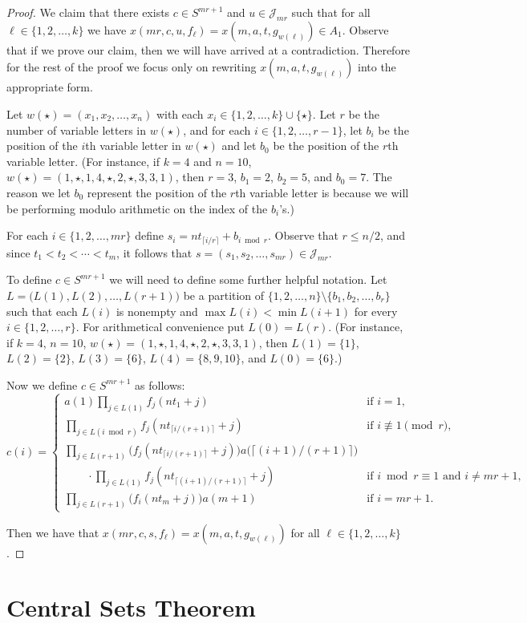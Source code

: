 \documentclass[12pt]{article}
\theoremstyle{plain}
\theoremstyle{definition}
\newcommand{\calJ}{\mathcal{J}}
\begin{document}
\begin{proof}
  We claim that there exists $c \in S^{mr+1}$ and $u \in \calJ_{mr}$ such that for all $\ell \in \{1, 2, \ldots, k\}$ we have $x(mr, c, u, f_\ell) = x(m, a, t, g_{w(\ell)}) \in A_1$. 
  Observe that if we prove our claim, then we will have arrived at a contradiction. 
  Therefore for the rest of the proof we focus only on rewriting $x(m, a, t, g_{w(\ell)})$ into the appropriate form.

  Let $w(\star) = (x_1, x_2, \ldots, x_n)$ with each $x_i \in \{1, 2, \ldots, k\} \cup \{\star\}$. 
  Let $r$ be the number of variable letters in $w(\star)$, and for each $i \in \{1, 2, \ldots, r-1\}$, let $b_i$ be the position of the \mbox{$i$th} variable letter in $w(\star)$ and let $b_0$ be the position of the \mbox{$r$th} variable letter.
  (For instance, if $k = 4$ and $n = 10$, $w(\star) = (1, \star, 1, 4, \star, 2, \star, 3, 3, 1)$, then $r = 3$, $b_1 = 2$, $b_2 = 5$, and $b_0 = 7$.
  The reason we let $b_0$ represent the position of the \mbox{$r$th} variable letter is because we will be performing modulo arithmetic on the index of the $b_i$'s.)

  For each $i \in \{1, 2, \ldots, mr\}$ define $s_i = nt_{\lceil i/r \rceil} + b_{i \bmod r}$.
  Observe that $r \le n/2$, and since $t_1 < t_2 < \cdots < t_m$, it follows that $s = (s_1, s_2, \ldots, s_{mr}) \in \calJ_{mr}$.

  To define $c \in S^{mr+1}$ we will need to define some further helpful notation. 
  Let $L = \bigl( L(1), L(2), \ldots, L(r+1) \bigr)$ be a partition of $\{1, 2, \ldots, n\} \setminus \{b_1, b_2, \ldots, b_r\}$ such that each $L(i)$ is nonempty and $\max L(i) < \min L(i+1)$ for every $i \in \{1, 2, \ldots, r\}$. 
  For arithmetical convenience put $L(0) = L(r)$. 
  (For instance, if $k = 4$, $n = 10$, $w(\star) = (1, \star, 1, 4, \star, 2, \star, 3, 3, 1)$, then $L(1) = \{1\}$, $L(2) = \{2\}$, $L(3) = \{6\}$, $L(4) = \{8, 9, 10\}$, and $L(0) = \{6\}$.)

  Now we define $c \in S^{mr+1}$ as follows:
  \[
    c(i) = 
    \begin{cases}
      a(1)\prod_{j \in L(1)} f_j(nt_1 + j) & \mbox{if $i = 1$,} \\
      \prod_{j \in L(i \bmod r)}  f_j(nt_{\lceil i/(r+1) \rceil} + j) & \mbox{if $i \not\equiv 1 \pmod r$, }\\
      \prod_{j \in L(r+1)} \bigl( f_j(nt_{\lceil i/(r+1) \rceil} + j) \bigr) a\bigl( \lceil (i+1)/(r+1) \rceil \bigr) & \\
      \hspace{2em} \cdot\prod_{j \in L(1)} f_j(nt_{\lceil (i+1)/(r+1) \rceil} + j) & \mbox{if $i \bmod r \equiv 1$ and $i \ne mr +1$, }\\
      \prod_{j \in L(r+1)} \bigr( f_i(nt_m + j) \bigr) a(m+1) & \mbox{if $i = mr + 1$.}
    \end{cases}
  \]

  Then we have that $x(mr, c, s, f_\ell) = x(m, a, t, g_{w(\ell)})$ for all $\ell \in \{1, 2, \ldots, k\}$.
\end{proof}


\section{Central Sets Theorem}




\end{document}
